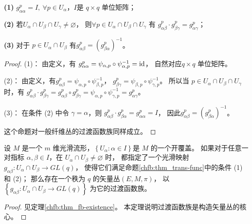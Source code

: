 \begin{proposition}\label{chfb:thm_trans-func}
{\bfseries (1)} $g_{\alpha \alpha}^p=I,\ \forall p \in U_\alpha$，$I$是 $q \times q$ 单位矩阵；

{\bfseries (2)} 若$U_\alpha \cap U_\beta \cap U_\gamma \neq \varnothing$，
则$\forall p \in U_\alpha \cap U_\beta \cap U_\gamma$ 有
$g_{\alpha \beta}^p \cdot g_{\beta \gamma}^p=g_{\alpha \gamma}^p $；

{\bfseries (3)} 对于 $p \in U_\alpha \cap U_\beta$ 有$g_{\alpha \beta}^p=(g_{\beta \alpha}^p)^{-1} $。
\end{proposition}

\begin{proof}
    (1)： 由定义，有
    $ g_{\alpha \alpha}^p=\psi_{\alpha, p} \circ \psi_{\alpha, p}^{-1} = {\rm id}    $，
    自然对应$q \times q$ 单位矩阵。
    
(2)： 由定义，有$g_{\alpha \beta}^p=\psi_{\alpha, p} \circ \psi_{\beta, p}^{-1}$，
$g_{\beta \gamma}^p=\psi_{\beta, p} \circ \psi_{\gamma, p}^{-1}$。
所以当 $p \in U_\alpha \cap U_\beta \cap U_\gamma$ 时，有
$  g_{\alpha \beta}^p \cdot g_{\beta \gamma}^p 
    =  g_{\alpha \beta}^p \circ g_{\beta \gamma}^p 
    =  \psi_{\alpha, p} \circ \psi_{\gamma, p}^{-1}=g_{\alpha \gamma}^p$。


(3)： 在条件 (2) 中令 $\gamma=\alpha$，则
$g_{\alpha \beta}^p \cdot g_{\beta \alpha}^p=g_{\alpha\alpha}^p=I$，
因此$g_{\alpha \beta}^p=\left(g_{\beta \alpha}^p\right)^{-1} $。

这个命题对一般纤维丛的过渡函数族同样成立。
\end{proof}


\begin{theorem}\label{chfb:thm_vector-existence}
设 $M$ 是一个 $m$ 维光滑流形，$\left\{U_\alpha: \alpha \in I\right\}$是 $M$ 的一个开覆盖。
如果对于任意一对指标 $\alpha, \beta \in I$，在 $U_\alpha \cap U_\beta \neq \varnothing$ 时，
都指定了一个光滑映射 $g_{\alpha \beta}: U_\alpha \cap U_\beta \rightarrow GL(q)$，
使得它们满足命题\ref{chfb:thm_trans-func}中的条件 (1)和 (2)；
那么存在一个秩为 $q$ 的矢量丛$(E,M,\pi)$，
以 $\left\{g_{\alpha \beta}: U_\alpha \cap U_\beta \rightarrow GL(q)\right\}$ 为它的过渡函数族。
\end{theorem}

\begin{proof}
    见定理\ref{chfb:thm_fb-existence}。
    本定理说明过渡函数族是构造矢量丛的核心。
\end{proof}





